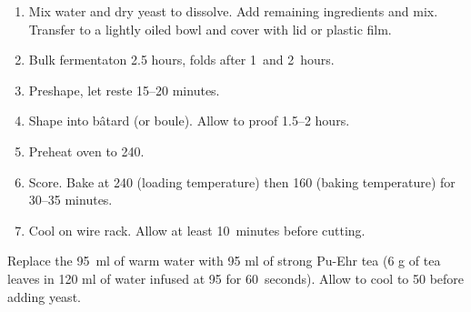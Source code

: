 
\begin{ingredients}
\end{ingredients}


\begin{recipe}
  \begin{enumerate}

  \item Mix water and dry yeast to dissolve.  Add remaining
    ingredients and mix.  Transfer to a lightly oiled bowl and cover
    with lid or plastic film.
    
  \item Bulk fermentaton 2.5 hours, folds after 1~and 2~hours.
    
  \item Preshape, let reste 15--20 minutes.
    
  \item Shape into bâtard (or boule).  Allow to proof 1.5--2 hours.
    
  \item Preheat oven to 240\degreeC.
    
  \item Score.  Bake at 240\degreeC{} (loading temperature) then
    160\degreeC{} (baking temperature) for 30--35 minutes.

  \item Cool on wire rack.  Allow at least 10~minutes before cutting.
    
  \end{enumerate}
\end{recipe}


Replace the 95~ml of warm water with 95 ml of strong Pu-Ehr tea (6 g
of tea leaves in 120 ml of water infused at 95\degreeC{} for
60~seconds).  Allow to cool to 50\degreeC{} before adding yeast.

